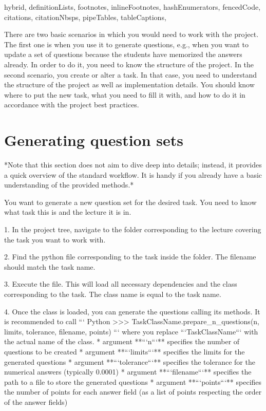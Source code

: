 \documentclass[
  digital, %
  table,   %
  twoside, %
  nolof,     %
  nolot,     %
  draft=false,
  final,
]{fithesis3}
\begin{document}
\shorthandoff{-}
\begin{markdown*}{%
  hybrid,
  definitionLists,
  footnotes,
  inlineFootnotes,
  hashEnumerators,
  fencedCode,
  citations,
  citationNbsps,
  pipeTables,
  tableCaptions,
}

There are two basic scenarios in which you would need to work with the project. The first one is when you use it to generate questions, e.g., when you want to update a set of questions because the students have memorized the answers already. In order to do it, you need to know the structure of the project. In the second scenario, you create or alter a task. In that case, you need to understand the structure of the project as well as implementation details. You should know where to put the new task, what you need to fill it with, and how to do it in accordance with the project best practices. 

\section{Generating question sets}

*Note that this section does not aim to dive deep into details; instead, it provides a quick overview of the standard workflow. It is handy if you already have a basic understanding of the provided methods.*

You want to generate a new question set for the desired task. You need to know what task this is and the lecture it is in. 

1. In the project tree, navigate to the folder corresponding to the lecture covering the task you want to work with.
    
2. Find the python file corresponding to the task inside the folder. The filename should match the task name.
    
3. Execute the file. This will load all necessary dependencies and the class corresponding to the task. The class name is equal to the task name. 
    
4. Once the class is loaded, you can generate the questions calling its methods. It is recommended to call
``` Python
>>> TaskClassName.prepare_n_questions(n,  limits, tolerance, filename, points)
```
where you replace ```TaskClassName``` with the actual name of the class. 
    * argument **```n```** specifies the number of questions to be created
    * argument **```limits```** specifies the limits for the generated questions
    * argument **```tolerance```** specifies the tolerance for the numerical answers (typically 0.0001)
    * argument **```filename```** specifies the path to a file to store the generated questions
    * argument **```points```** specifies the number of points for each answer field (as a list of points respecting the order of the answer fields)
    

\end{markdown*}
\end{document}
